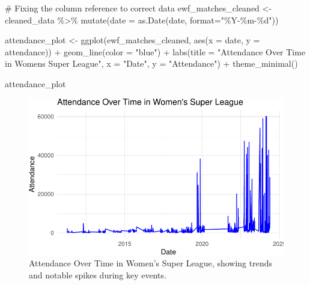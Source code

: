\documentclass[
  letterpaper,
  DIV=11,
  numbers=noendperiod]{scrartcl}
\newenvironment{Shaded}{\begin{snugshade}}{\end{snugshade}}
\newcommand{\AttributeTok}[1]{\textcolor[rgb]{0.40,0.45,0.13}{#1}}
\newcommand{\CommentTok}[1]{\textcolor[rgb]{0.37,0.37,0.37}{#1}}
\newcommand{\FunctionTok}[1]{\textcolor[rgb]{0.28,0.35,0.67}{#1}}
\newcommand{\NormalTok}[1]{\textcolor[rgb]{0.00,0.23,0.31}{#1}}
\newcommand{\OtherTok}[1]{\textcolor[rgb]{0.00,0.23,0.31}{#1}}
\newcommand{\SpecialCharTok}[1]{\textcolor[rgb]{0.37,0.37,0.37}{#1}}
\newcommand{\StringTok}[1]{\textcolor[rgb]{0.13,0.47,0.30}{#1}}
\begin{document}
\begin{Shaded}
\begin{Highlighting}[]
\CommentTok{\# Fixing the column reference to correct data}
\NormalTok{ewf\_matches\_cleaned }\OtherTok{\textless{}{-}}\NormalTok{ cleaned\_data }\SpecialCharTok{\%\textgreater{}\%}
  \FunctionTok{mutate}\NormalTok{(}\AttributeTok{date =} \FunctionTok{as.Date}\NormalTok{(date, }\AttributeTok{format=}\StringTok{"\%Y{-}\%m{-}\%d"}\NormalTok{))}

\NormalTok{attendance\_plot }\OtherTok{\textless{}{-}} \FunctionTok{ggplot}\NormalTok{(ewf\_matches\_cleaned, }\FunctionTok{aes}\NormalTok{(}\AttributeTok{x =}\NormalTok{ date, }\AttributeTok{y =}\NormalTok{ attendance)) }\SpecialCharTok{+}
  \FunctionTok{geom\_line}\NormalTok{(}\AttributeTok{color =} \StringTok{"blue"}\NormalTok{) }\SpecialCharTok{+}
  \FunctionTok{labs}\NormalTok{(}\AttributeTok{title =} \StringTok{"Attendance Over Time in Women\textquotesingle{}s Super League"}\NormalTok{, }\AttributeTok{x =} \StringTok{"Date"}\NormalTok{, }\AttributeTok{y =} \StringTok{"Attendance"}\NormalTok{) }\SpecialCharTok{+}
  \FunctionTok{theme\_minimal}\NormalTok{()}

\NormalTok{attendance\_plot}
\end{Highlighting}
\end{Shaded}

\begin{figure}[H]

{\centering \includegraphics{paper_files/figure-pdf/fig-attendance-over-time-1.pdf}

}

\caption{\label{fig-attendance-over-time}Attendance Over Time in Women's
Super League, showing trends and notable spikes during key events.}

\end{figure}
\end{document}
